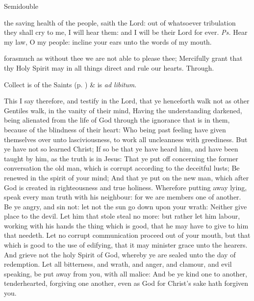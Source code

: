 \begin{inhead}
{Semidouble}
\end{inhead}

\properantiphonfix

\introit
{} the saving health of the people, saith the Lord: out of whatsoever tribulation they shall cry to me, I will hear them: and I will be their Lord for ever. \textit{Ps.} Hear my law, O my people: incline your ears unto the words of my mouth.

\collect
{} forasmuch as without thee we are not able to please thee; Mercifully grant that thy Holy Spirit may in all things direct and rule our hearts. Through.
\begin{rubric}
     Collect is of the Saints (p. \pageref{SPSaints}) \&  is \emph{ad libitum}.
\end{rubric}

 This I say therefore, and testify in the Lord, that ye henceforth walk not as other Gentiles walk, in the vanity of their mind, Having the understanding darkened, being alienated from the life of God through the ignorance that is in them, because of the blindness of their heart: Who being past feeling have given themselves over unto lasciviousness, to work all uncleanness with greediness. But ye have not so learned Christ; If so be that ye have heard him, and have been taught by him, as the truth is in Jesus: That ye put off concerning the former conversation the old man, which is corrupt according to the deceitful lusts; Be renewed in the spirit of your mind; And that ye put on the new man, which after God is created in righteousness and true holiness. Wherefore putting away lying, speak every man truth with his neighbour: for we are members one of another. Be ye angry, and sin not: let not the sun go down upon your wrath: Neither give place to the devil. Let him that stole steal no more: but rather let him labour, working with his hands the thing which is good, that he may have to give to him that needeth. Let no corrupt communication proceed out of your mouth, but that which is good to the use of edifying, that it may minister grace unto the hearers. And grieve not the holy Spirit of God, whereby ye are sealed unto the day of redemption. Let all bitterness, and wrath, and anger, and clamour, and evil speaking, be put away from you, with all malice: And be ye kind one to another, tenderhearted, forgiving one another, even as God for Christ's sake hath forgiven you.

